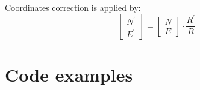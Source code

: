 \documentclass[10pt,letterpaper]{article}
\numberwithin{equation}{section}
\numberwithin{figure}{section}
\numberwithin{table}{section}
\begin{document}
Coordinates correction is applied by:
\begin{equation}
    \begin{bmatrix}
        N^{'} \\ E^{'}
    \end{bmatrix} = \begin{bmatrix}
        N \\ E
    \end{bmatrix} \cdot \frac{R^{'}}{R}
\end{equation}


\section{Code examples}

\lstset{language=Matlab,frame=single}











\end{document}
